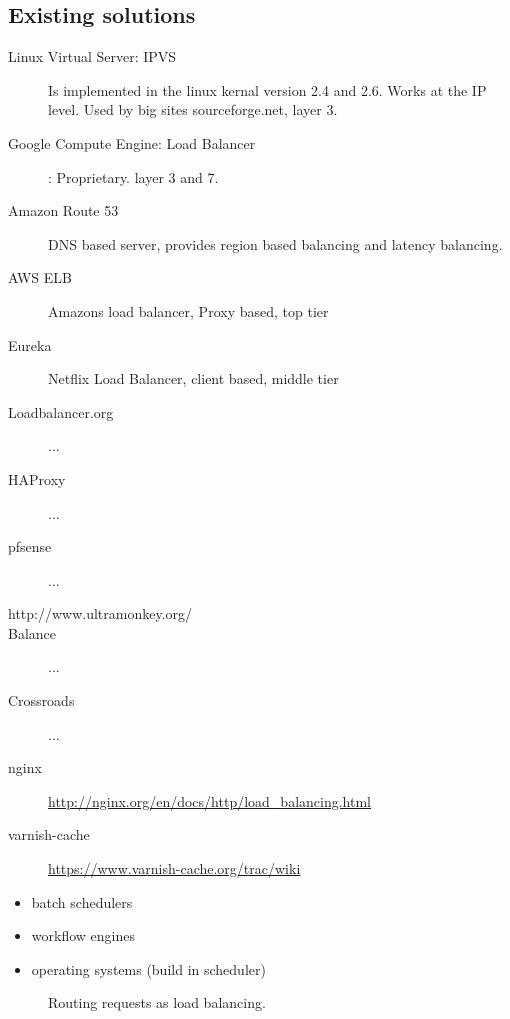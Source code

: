 \subsection{Existing solutions}
\begin{description}
	\item [Linux Virtual Server: IPVS] Is implemented in the linux kernal version 2.4 and 2.6. Works at the IP level. Used by big sites sourceforge.net, layer 3.
	\item [Google Compute Engine: Load Balancer]: Proprietary. layer 3 and 7.
	\item [Amazon Route 53] DNS based server, provides region based balancing and latency balancing.
	\item [AWS ELB] Amazons load balancer, Proxy based, top tier
	\item [Eureka] Netflix Load Balancer, client based, middle tier

	\item [Loadbalancer.org] ...
	\item [HAProxy] ...
	\item [pfsense] ...
	\item [http://www.ultramonkey.org/]
	\item [Balance] ...
	\item [Crossroads] ...
	\item [nginx] \url{http://nginx.org/en/docs/http/load_balancing.html}
	\item [varnish-cache] \url{https://www.varnish-cache.org/trac/wiki}
\end{description}

\begin{itemize}
	\item batch schedulers
	\item workflow engines
	\item operating systems (build in scheduler)
\end{itemize}

\begin{figure}
	\centering	
	\scalebox{0.7}{}
	\caption[Routing requests as load balancing]{
		\label{fig:RoutingloadBalancingSetup} 
		\footnotesize{%
			Routing requests as load balancing.
		}
	}
\end{figure}


